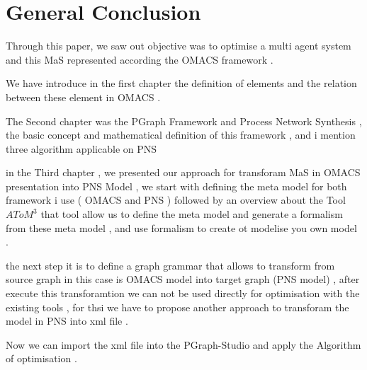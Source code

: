 
\chapter*{General Conclusion}


Through this paper, we saw out objective was to optimise a multi agent system 
and this MaS represented according the OMACS framework .

We have introduce  in the first chapter the definition of elements and the relation between these element in OMACS .

The Second chapter was the  PGraph Framework and  Process Network Synthesis , the basic concept and mathematical definition  of this framework , and i mention 
three algorithm applicable on PNS 

in the Third chapter , we presented our approach for transforam MaS in OMACS presentation into PNS Model , we start with defining the meta model for both framework i use ( OMACS and PNS )  followed by an overview about the Tool $AToM^3$ that tool allow us to define the meta model and generate a formalism 
from these meta model , and use formalism to create ot modelise you own model  .

the next step it is to define a graph grammar that allows to transform from source graph in this case is OMACS model into target graph (PNS model) , after execute this transforamtion we can not be used directly for optimisation with the existing tools , for thsi we have to propose another approach to transforam 
the model in PNS into xml file .

Now we can import the xml file into the PGraph-Studio and apply the Algorithm 
of optimisation . 
